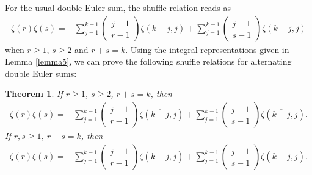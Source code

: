 \documentclass[reqno]{amsart}
\newtheorem{theorem}{Theorem}[section]
\theoremstyle{definition}
\theoremstyle{remark}
\numberwithin{equation}{section}
\begin{document}
For the usual double Euler sum, the shuffle relation reads as
\begin{align}
\zeta(r)\zeta(s)=&\sum_{j=1}^{k-1} \begin{pmatrix}j-1\\r-1\end{pmatrix} \zeta(k-j, j)+\sum_{j=1}^{k-1} \begin{pmatrix}j-1\\s-1\end{pmatrix} \zeta(k-j, j)
\end{align}when $r\geq 1$, $s\geq 2$ and $r+s=k$.
Using the integral representations given in Lemma \ref{lemma5}, we can prove the following shuffle relations for alternating double Euler sums:
\begin{theorem}\label{shuffle}
If $r\geq 1$, $s\geq 2$, $r+s=k$, then
\begin{align}
\zeta(\overline{r})\zeta(s)=&\sum_{j=1}^{k-1} \begin{pmatrix}j-1\\r-1\end{pmatrix} \zeta(\overline{k-j}, \overline{j})+\sum_{j=1}^{k-1} \begin{pmatrix}j-1\\s-1\end{pmatrix} \zeta(\overline{k-j}, j).\label{eq22}
\end{align}
If $r, s\geq 1$, $r+s=k$, then
\begin{align}\label{eq23}
\zeta(\overline{r})\zeta(\overline{s})=&\sum_{j=1}^{k-1}  \begin{pmatrix}j-1\\r-1\end{pmatrix} \zeta(k-j, \overline{j})+\sum_{j=1}^{k-1}  \begin{pmatrix}j-1\\s-1\end{pmatrix} \zeta(k-j, \overline{j}).
\end{align}
\end{theorem}
\end{document}
